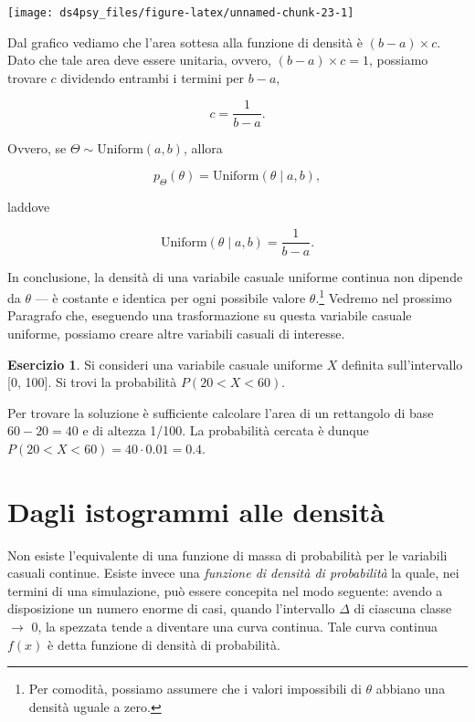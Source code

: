 \documentclass[
  11pt,
]{krantz}
\theoremstyle{definition}
\theoremstyle{definition}
\theoremstyle{definition}
\newtheorem{exercise}{Esercizio}[chapter]
\theoremstyle{definition}
\theoremstyle{remark}
\begin{document}
\begin{center}\texttt{[image: ds4psy\_files/figure-latex/unnamed-chunk-23-1]} \end{center}

\noindent Dal grafico vediamo che l'area sottesa alla funzione di densità è \((b - a)\times c\). Dato che tale area deve essere unitaria, ovvero, \((b - a) \times c = 1\), possiamo trovare \(c\) dividendo entrambi i termini per \(b - a\),

\[
c  = \frac{\displaystyle{1}}{\displaystyle b - a}.
\]

Ovvero, se \(\Theta \sim \mbox{Uniform}(a, b)\), allora

\[
p_{\Theta}(\theta) = \mbox{Uniform}(\theta \mid a, b),
\]

laddove

\[
\mbox{Uniform}(\theta \mid a, b) = \frac{1}{b - a}.
\]

In conclusione, la densità di una variabile casuale uniforme continua non dipende da \(\theta\) --- è costante e identica per ogni possibile valore \(\theta\).\footnote{Per comodità, possiamo assumere che i valori impossibili di \(\theta\) abbiano una densità uguale a zero.} Vedremo nel prossimo Paragrafo che, eseguendo una trasformazione su questa variabile casuale uniforme, possiamo creare altre variabili casuali di interesse.

\begin{exercise}
Si consideri una variabile casuale uniforme \(X\) definita sull'intervallo {[}0, 100{]}. Si trovi la probabilità \(P(20 < X < 60)\).

Per trovare la soluzione è sufficiente calcolare l'area di un rettangolo di base \(60 - 20 = 40\) e di altezza 1/100. La probabilità cercata è dunque \(P(20 < X < 60) = 40 \cdot 0.01 = 0.4\).
\end{exercise}

\hypertarget{dagli-istogrammi-alle-densituxe0}{%
\section{Dagli istogrammi alle densità}\label{dagli-istogrammi-alle-densituxe0}}

Non esiste l'equivalente di una funzione di massa di probabilità per le variabili casuali continue. Esiste invece una \emph{funzione di densità di probabilità} la quale, nei termini di una simulazione, può essere concepita nel modo seguente: avendo a disposizione un numero enorme di casi, quando l'intervallo \(\Delta\) di ciascuna classe \(\rightarrow\) 0, la spezzata tende a diventare una curva continua. Tale curva continua \(f(x)\) è detta funzione di densità di probabilità.
\end{document}
